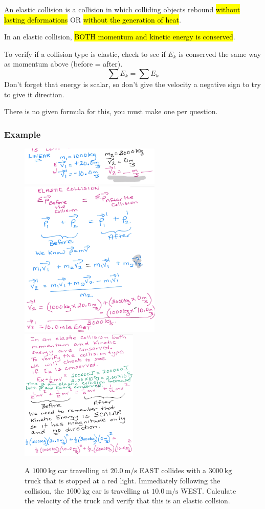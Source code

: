 \documentclass[a4paper,12pt]{article}
\begin{document}
An elastic collision is a collision in which colliding objects rebound \hl{without lasting deformations} OR \hl{without the generation of heat}.

In an elastic collision, \hl{BOTH momentum and kinetic energy is conserved}.

To verify if a collision type is elastic, check to see if $E_k$ is conserved the same way as momentum above (before = after).
$$\sum E_k = \sum E_k$$
Don't forget that energy is scalar, so don't give the velocity a negative sign to try to give it direction.

There is no given formula for this, you must make one per question.

\subsubsection{Example}
\begin{figure}[H]
    \caption{A $\SI{1000}{\kg}$ car travelling at $\SI{20.0}{\m/\s}$ EAST collides with a $\SI{3000}{\kg}$ truck that is stopped at a red light. Immediately following the collision, the $\SI{1000}{\kg}$ car is travelling at $\SI{10.0}{\m/\s}$ WEST. Calculate the velocity of the truck and verify that this is an elastic collsion.}
    \includegraphics[width=0.6\textwidth]{q-elastic-1a}
    \includegraphics[width=0.6\textwidth]{q-elastic-1b}
    \includegraphics[width=0.5\textwidth]{q-elastic-1c}
    \centering
\end{figure}
\end{document}
